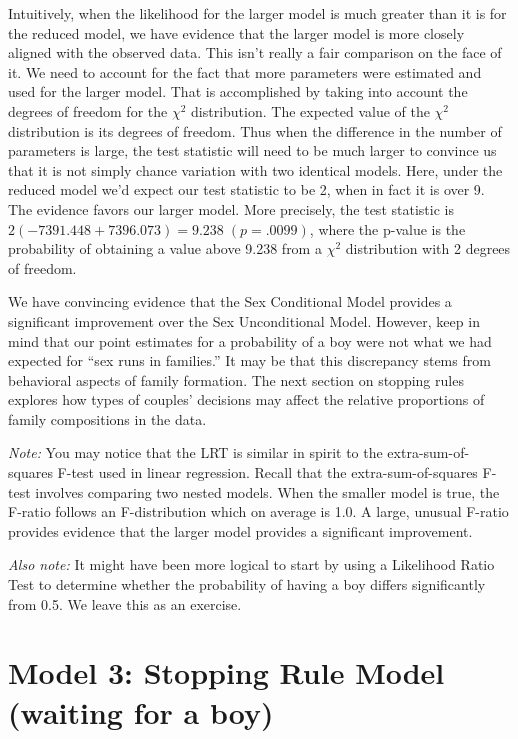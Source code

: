 \documentclass[
]{krantz}
\begin{document}
Intuitively, when the likelihood for the larger model is much greater than it is for the reduced model, we have evidence that the larger model is more closely aligned with the observed data. This isn't really a fair comparison on the face of it. We need to account for the fact that more parameters were estimated and used for the larger model. That is accomplished by taking into account the degrees of freedom for the \(\chi^2\) distribution. The expected value of the \(\chi^2\) distribution is its degrees of freedom. Thus when the difference in the number of parameters is large, the test statistic will need to be much larger to convince us that it is not simply chance variation with two identical models. Here, under the reduced model we'd expect our test statistic to be 2, when in fact it is over 9. The evidence favors our larger model. More precisely, the test statistic is \(2(-7391.448+7396.073) = 9.238\; (p=.0099)\), where the p-value is the probability of obtaining a value above 9.238 from a \(\chi^2\) distribution with 2 degrees of freedom.

We have convincing evidence that the Sex Conditional Model provides a significant improvement over the Sex Unconditional Model. However, keep in mind that our point estimates for a probability of a boy were not what we had expected for ``sex runs in families.'' It may be that this discrepancy stems from behavioral aspects of family formation. The next section on stopping rules explores how types of couples' decisions may affect the relative proportions of family compositions in the data.

\emph{Note: }You may notice that the LRT is similar in spirit to the extra-sum-of-squares F-test used in linear regression. Recall that the extra-sum-of-squares F-test involves comparing two nested models. When the smaller model is true, the F-ratio follows an F-distribution which on average is 1.0. A large, unusual F-ratio provides evidence that the larger model provides a significant improvement.

\emph{Also note: } It might have been more logical to start by using a Likelihood Ratio Test to determine whether the probability of having a boy differs significantly from 0.5. We leave this as an exercise.

\section{Model 3: Stopping Rule Model (waiting for a boy)}\label{model-3-stopping-rule-model-waiting-for-a-boy}
\end{document}

